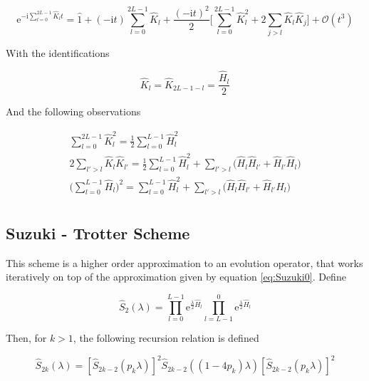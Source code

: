   \begin{equation}
    \mathrm{e}^{-\mathrm{i}\sum_{l = 0}^{2L-1} \hat{K}_l t} = \hat{1} + (-\mathrm{i}t)\sum_{l = 0}^{2L-1} \hat{K}_l + \frac{(-\mathrm{i}t)^2}{2} \Bigg[\sum_{l = 0}^{2L-1} \hat{K}_l^2 + 2 \sum_{j > l}\hat{K}_l \hat{K}_j\Bigg] + \mathcal{O}(t^3)
    \label{eq:TrotterFormula1}
  \end{equation}

  With the identifications

  \begin{equation}
    \hat{K}_l = \hat{K}_{2L-1-l} = \frac{\hat{H}_l}{2}
    \label{eq:Identifications}
  \end{equation}

  And the following observations

  \begin{equation}
    \begin{gathered}
      \sum_{l = 0}^{2L-1} \hat{K}_l^2 = \frac{1}{2}\sum_{l = 0}^{L-1} \hat{H}_l^2 \\
      2\sum_{l' > l} \hat{K}_{l} \hat{K}_{l'} = \frac{1}{2}\sum_{l = 0}^{L-1} \hat{H}_l^2 + \sum_{l'> l} \Bigg( \hat{H}_{l} \hat{H}_{l'} + \hat{H}_{l'} \hat{H}_{l}\Bigg)\\
      \Bigg(\sum_{l = 0}^{L-1} \hat{H}_l \Bigg)^2 = \sum_{l = 0}^{L-1} \hat{H}_l^2 + \sum_{l'> l} \Bigg( \hat{H}_{l} \hat{H}_{l'} + \hat{H}_{l'} \hat{H}_{l}\Bigg)\\
    \end{gathered}
  \end{equation}

  \subsection{Suzuki - Trotter Scheme}
  This scheme is a higher order approximation to an evolution operator, that works iteratively on top of the approximation given by equation \ref{eq:Suzuki0}. Define \cite{SuzukiFormula, BerryErrorBounds}

  \begin{equation}
    \hat{S}_2(\lambda) = \prod_{l = 0}^{L-1} \mathrm{e}^{\frac{\lambda}{2}\hat{H}_l} \prod_{l = L-1}^{0} \mathrm{e}^{\frac{\lambda}{2}\hat{H}_l}
    \label{eq:SuzukiInit}
  \end{equation}

  Then, for $k > 1$, the following recursion relation is defined

  \begin{equation}
    \hat{S}_{2k}(\lambda) = [\hat{S}_{2k-2}(p_k\lambda)]^2 \hat{S}_{2k-2}((1 - 4 p_k)\lambda) [\hat{S}_{2k-2}(p_k\lambda)]^2
    \label{eq:SuzukiRecursion}
  \end{equation}

